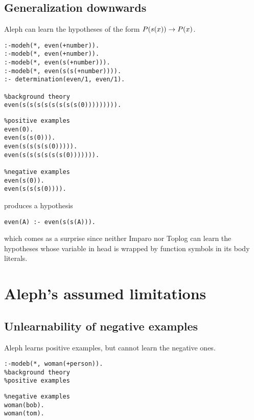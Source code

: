 \subsection{Generalization downwards}
Aleph can learn the hypotheses of the form $P(s(x)) \to P(x)$.

\begin{minipage}[t]{.50\textwidth}
\begin{lstlisting}
:-modeh(*, even(+number)).
:-modeb(*, even(+number)).
:-modeb(*, even(s(+number))).
:-modeb(*, even(s(s(+number)))).
:- determination(even/1, even/1).

%background theory
even(s(s(s(s(s(s(s(s(0))))))))).
\end{lstlisting}
\end{minipage}
\begin{minipage}[t]{.20\textwidth}
\begin{lstlisting}
%positive examples
even(0).
even(s(s(0))).
even(s(s(s(s(0))))).
even(s(s(s(s(s(s(0))))))).

%negative examples
even(s(0)).
even(s(s(s(0)))).
\end{lstlisting}
\end{minipage}

produces a hypothesis
\begin{lstlisting}
even(A) :- even(s(s(A))).
\end{lstlisting}
which comes as a surprise since neither Imparo nor Toplog can learn the hypotheses whose variable in head is wrapped by function symbols in its body literals.

\section{Aleph's assumed limitations}
\subsection{Unlearnability of negative examples}
Aleph learns positive examples, but cannot learn the negative ones.

\begin{minipage}[t]{.50\textwidth}
\begin{lstlisting}
:-modeb(*, woman(+person)).
%background theory
%positive examples
\end{lstlisting}
\end{minipage}
\begin{minipage}[t]{.20\textwidth}
\begin{lstlisting}
%negative examples
woman(bob).
woman(tom).
\end{lstlisting}
\end{minipage}

